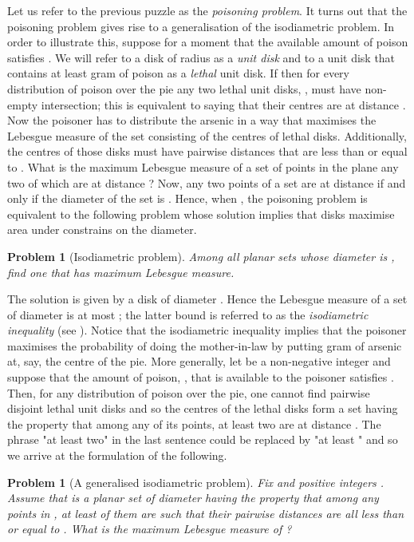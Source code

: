 \documentclass[12pt]{article}
\newtheorem{prbl}[thm]{Problem}
\begin{document}
Let us refer to the previous puzzle as the \emph{poisoning problem}.
It turns out that the poisoning problem gives rise to a generalisation of the isodiametric problem. 
In order to illustrate this,
suppose for a moment that the available amount of poison satisfies . 
We will refer to a disk of radius  as a \emph{unit disk}  and
to a unit disk that contains at least  gram of poison as a  \emph{lethal} unit disk. 
If  then for every
distribution of poison over the pie any two lethal unit disks, , must
have non-empty intersection; this is equivalent to saying that 
their centres are at distance . Now the poisoner has to distribute the arsenic 
in a way that maximises the Lebesgue measure of the set consisting of the centres of lethal disks. 
Additionally, the centres of those disks must have pairwise distances that are less than or equal to .
What is the maximum Lebesgue measure of a set of points in the plane
any two of which are at distance ?
Now, any two points of a set are at distance  if and only if
the diameter of the set is . Hence, when , the poisoning problem is
equivalent to the following problem whose solution implies that disks maximise
area under constrains on the diameter. 

\begin{prbl}[Isodiametric problem] Among all planar sets whose diameter is , find one that
has maximum Lebesgue measure. 
\end{prbl}

The solution is given by a disk of diameter . Hence the Lebesgue measure of a set of diameter 
 is at most ; the latter bound is referred to as the \emph{isodiametric inequality} (see \cite{Gruber}). 
Notice that the isodiametric inequality implies that the 
poisoner maximises the probability of doing the mother-in-law  by
putting  gram of arsenic at, say, the centre  of the pie.
More generally, let  be a non-negative integer and suppose that the amount of 
poison, , that is available to the poisoner satisfies 
. Then, for any distribution of poison over the pie,
one cannot find  pairwise disjoint lethal unit disks
and so  the centres of the lethal disks form a set having  the property that among any  of its points, 
at least two are at distance .  The phrase "at least two" in the last sentence could be replaced by 
"at least " and so
we arrive at the formulation of the following. 


\begin{prbl}[A generalised isodiametric problem]
\label{probone}
Fix  and positive integers . Assume that  is a planar set of 
diameter  having 
the property that
among any  points in , at least  of them are such that 
their pairwise distances are  all
less than or equal to . What is the
maximum Lebesgue measure of ? 
\end{prbl}
\end{document}
